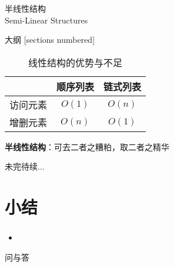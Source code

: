 \begin{standout}[第二章]
    半线性结构\\
    Semi-Linear Structures
\end{standout}

\begin{frame}{大纲}
    [sections numbered]
    \tableofcontents
\end{frame}

\begin{frame}
    \begin{table}
        \small
        \label{tab:linear_structures_disadvantages}
        \caption{线性结构的优势与不足}
        \begin{tabular}{rcc}
            \toprule
            & \textbf{顺序列表} & \textbf{链式列表} \\
            \midrule
            访问元素 & $O(1)$ & $O(n)$ \\
            增删元素 & $O(n)$ & $O(1)$ \\
            \bottomrule
        \end{tabular}
    \end{table}
    \pause
    \centering
    \textbf{半线性结构}：可去二者之糟粕，取二者之精华
\end{frame}

% 
% 


\begin{standout}[]
    未完待续$\dots$
\end{standout}

\section{小结}

\begin{frame}
    \frametitle{\insertsectionhead}
    \begin{itemize}
        \item 
    \end{itemize}
\end{frame}

\begin{standout}[]
    问与答
\end{standout}
